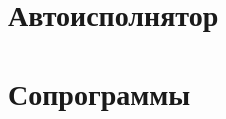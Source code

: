 \documentclass[../index.tex]{subfiles}
\begin{document}
\section{Автоисполнятор}

\section{Сопрограммы}
\end{document}
